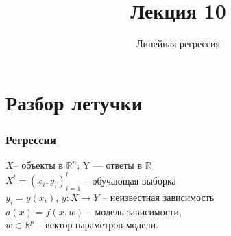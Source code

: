 \documentclass[10pt]{beamer}
\title{Лекция 10}
\subtitle{Линейная регрессия}
\begin{document}
	

\section{Разбор летучки}

\frame{\titlepage}

\begin{frame}\frametitle{Регрессия}
	$X$-- объекты в $\mathbb{R}^n$; Y — ответы в $\mathbb{R}$\\
	$X^l = (x_i, y_i)_{i=1}^l$ -- обучающая выборка\\
	$y_i = y(x_i)$, \qquad $y : X \rightarrow Y$ -- неизвестная зависимость\\
	\bigbreak
	\pause
	$a(x) = f (x, w)$ -- модель зависимости,\\
	$w \in \mathbb{R}^p$ -- вектор параметров модели.\\
	\bigbreak
\end{frame}
\end{document}
